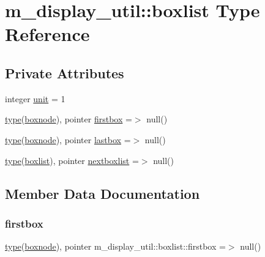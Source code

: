 \hypertarget{structm__display__util_1_1boxlist}{}\section{m\+\_\+display\+\_\+util\+:\+:boxlist Type Reference}
\label{structm__display__util_1_1boxlist}
\subsection*{Private Attributes}
\begin{DoxyCompactItemize}
\item 
integer \hyperlink{structm__display__util_1_1boxlist_a25d8047955ec4e12f09ff9233ba5c666}{unit} = 1
\item 
\hyperlink{stop__watch_83_8txt_a70f0ead91c32e25323c03265aa302c1c}{type}(\hyperlink{structm__display__util_1_1boxnode}{boxnode}), pointer \hyperlink{structm__display__util_1_1boxlist_ada3bfedc8682447158b2b0e4b662773a}{firstbox} =$>$ null()
\item 
\hyperlink{stop__watch_83_8txt_a70f0ead91c32e25323c03265aa302c1c}{type}(\hyperlink{structm__display__util_1_1boxnode}{boxnode}), pointer \hyperlink{structm__display__util_1_1boxlist_ada85bf1694f8522fa4f401c7e7dd34d3}{lastbox} =$>$ null()
\item 
\hyperlink{stop__watch_83_8txt_a70f0ead91c32e25323c03265aa302c1c}{type}(\hyperlink{structm__display__util_1_1boxlist}{boxlist}), pointer \hyperlink{structm__display__util_1_1boxlist_a51aeeb63272988f526937af58361c577}{nextboxlist} =$>$ null()
\end{DoxyCompactItemize}


\subsection{Member Data Documentation}
\mbox{\label{structm__display__util_1_1boxlist_ada3bfedc8682447158b2b0e4b662773a}} 
\subsubsection{\texorpdfstring{firstbox}{firstbox}}
{\footnotesize\ttfamily \hyperlink{stop__watch_83_8txt_a70f0ead91c32e25323c03265aa302c1c}{type}(\hyperlink{structm__display__util_1_1boxnode}{boxnode}), pointer m\+\_\+display\+\_\+util\+::boxlist\+::firstbox =$>$ null()\hspace{0.3cm}{\ttfamily [private]}}

